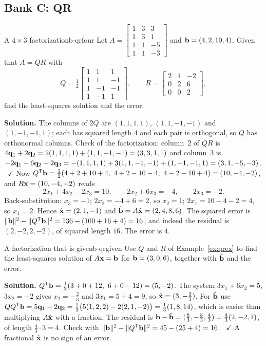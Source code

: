 \documentclass[11pt]{article}
\begin{document}
\subsection*{Bank C: QR}
\begin{exmp}{A $4\times3$ factorization}{b-qrfour}
Let $A=\begin{bmatrix}1&3&3\\1&3&1\\1&1&-5\\1&1&-3\end{bmatrix}$ and $\mathbf{b}=(4,2,10,4)$. Given that $A=QR$ with
\[
Q=\tfrac12\begin{bmatrix}1&1&1\\1&1&-1\\1&-1&-1\\1&-1&1\end{bmatrix},\qquad R=\begin{bmatrix}2&4&-2\\0&2&6\\0&0&2\end{bmatrix},
\]
find the least-squares solution and the error.

\textbf{Solution.} The columns of $2Q$ are $(1,1,1,1)$, $(1,1,-1,-1)$ and $(1,-1,-1,1)$; each has squared length $4$ and each pair is orthogonal, so $Q$ has orthonormal columns. Check of the factorization: column~2 of $QR$ is $4\mathbf{q}_1+2\mathbf{q}_2=2(1,1,1,1)+(1,1,-1,-1)=(3,3,1,1)$ and column~3 is $-2\mathbf{q}_1+6\mathbf{q}_2+2\mathbf{q}_3=-(1,1,1,1)+3(1,1,-1,-1)+(1,-1,-1,1)=(3,1,-5,-3)$. \ $\checkmark$ Now $Q\T\bv{b}=\tfrac12(4+2+10+4,\ 4+2-10-4,\ 4-2-10+4)=(10,-4,-2)$, and $R\mathbf{x}=(10,-4,-2)$ reads
\[
2x_1+4x_2-2x_3=10,\qquad2x_2+6x_3=-4,\qquad2x_3=-2 .
\]
Back-substitution: $x_3=-1$; $2x_2=-4+6=2$, so $x_2=1$; $2x_1=10-4-2=4$, so $x_1=2$. Hence $\hat{\mathbf{x}}=(2,1,-1)$ and $\hat{\mathbf{b}}=A\hat{\mathbf{x}}=(2,4,8,6)$. The squared error is $\lVert\mathbf{b}\rVert^2-\lVert Q^{\mathsf T}\mathbf{b}\rVert^2=136-(100+16+4)=16$, and indeed the residual is $(2,-2,2,-2)$, of squared length $16$. The error is $4$.
\end{exmp}

\begin{exmp}{A factorization that is given}{b-qrgiven}
Use $Q$ and $R$ of Example~\ref{ex:qrex} to find the least-squares solution of $A\mathbf{x}=\mathbf{b}$ for $\mathbf{b}=(3,0,6)$, together with $\hat{\mathbf{b}}$ and the error.

\textbf{Solution.} $Q^{\mathsf T}\mathbf{b}=\tfrac13(3+0+12,\ 6+0-12)=(5,-2)$. The system $3x_1+6x_2=5$, $3x_2=-2$ gives $x_2=-\tfrac23$ and $3x_1=5+4=9$, so $\hat{\mathbf{x}}=(3,-\tfrac23)$. For $\hat{\mathbf{b}}$ use $QQ^{\mathsf T}\mathbf{b}=5\mathbf{q}_1-2\mathbf{q}_2=\tfrac13\bigl(5(1,2,2)-2(2,1,-2)\bigr)=\tfrac13(1,8,14)$, which is easier than multiplying $A\hat{\mathbf{x}}$ with a fraction. The residual is $\mathbf{b}-\hat{\mathbf{b}}=(\tfrac83,-\tfrac83,\tfrac43)=\tfrac43(2,-2,1)$, of length $\tfrac43\cdot3=4$. Check with $\lVert\mathbf{b}\rVert^2-\lVert Q^{\mathsf T}\mathbf{b}\rVert^2=45-(25+4)=16$. \ $\checkmark$ A fractional $\hat{\mathbf{x}}$ is no sign of an error.
\end{exmp}
\end{document}
